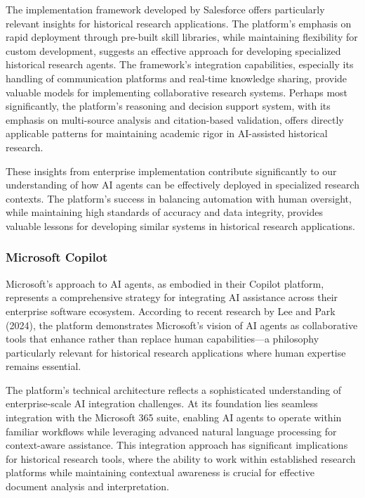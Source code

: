 \documentclass[
]{article}
\begin{document}
The implementation framework developed by Salesforce offers particularly
relevant insights for historical research applications. The platform's
emphasis on rapid deployment through pre-built skill libraries, while
maintaining flexibility for custom development, suggests an effective
approach for developing specialized historical research agents. The
framework's integration capabilities, especially its handling of
communication platforms and real-time knowledge sharing, provide
valuable models for implementing collaborative research systems. Perhaps
most significantly, the platform's reasoning and decision support
system, with its emphasis on multi-source analysis and citation-based
validation, offers directly applicable patterns for maintaining academic
rigor in AI-assisted historical research.

These insights from enterprise implementation contribute significantly
to our understanding of how AI agents can be effectively deployed in
specialized research contexts. The platform's success in balancing
automation with human oversight, while maintaining high standards of
accuracy and data integrity, provides valuable lessons for developing
similar systems in historical research applications.

\subsubsection{Microsoft Copilot}\label{microsoft-copilot}

Microsoft's approach to AI agents, as embodied in their Copilot
platform, represents a comprehensive strategy for integrating AI
assistance across their enterprise software ecosystem. According to
recent research by Lee and Park (2024), the platform demonstrates
Microsoft's vision of AI agents as collaborative tools that enhance
rather than replace human capabilities---a philosophy particularly
relevant for historical research applications where human expertise
remains essential.

The platform's technical architecture reflects a sophisticated
understanding of enterprise-scale AI integration challenges. At its
foundation lies seamless integration with the Microsoft 365 suite,
enabling AI agents to operate within familiar workflows while leveraging
advanced natural language processing for context-aware assistance. This
integration approach has significant implications for historical
research tools, where the ability to work within established research
platforms while maintaining contextual awareness is crucial for
effective document analysis and interpretation.
\end{document}
